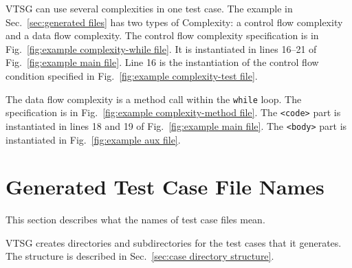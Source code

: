 \documentclass[12pt]{article}
\begin{document}
VTSG can use several complexities in one test case.
The example in Sec.~\ref{sec:generated files} has two types of
Complexity: a control flow complexity and a data flow complexity. 
The control flow complexity specification is in 
Fig.~\ref{fig:example complexity-while file}.  It is instantiated in 
lines 16--21 of
Fig.~\ref{fig:example main file}.  Line 16 is the instantiation of 
the control flow condition
specified in Fig.~\ref{fig:example complexity-test file}.

The data flow complexity is a method call within the \verb|while| loop.  
The specification
is in Fig.~\ref{fig:example complexity-method file}.  
The \verb|<code>|
part is instantiated in lines 18 and 19 of 
Fig.~\ref{fig:example main file}. 
The \verb|<body>| part is instantiated in
Fig.~\ref{fig:example aux file}.


\section{Generated Test Case File Names}

This section describes what the
names of test case files mean.

VTSG creates directories and subdirectories for the test cases that it generates.
The structure is described in
Sec.~\ref{sec:case directory structure}.

\label{sec:case file name}
\end{document}

